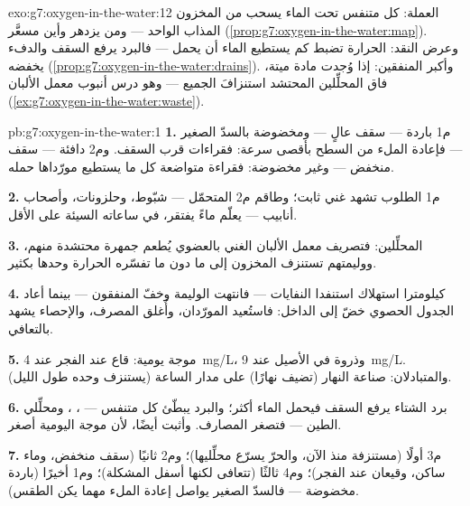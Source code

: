 \begin{solution}{exo:g7:oxygen-in-the-water:12}
العملة: كل متنفس تحت الماء يسحب من المخزون المذاب الواحد --- ومن
يزدهر وأين مسعَّر 
(\cref{prop:g7:oxygen-in-the-water:map}). وعرض النقد: الحرارة تضبط
كم يستطيع الماء أن يحمل --- فالبرد يرفع السقف والدفء يخفضه
(\cref{prop:g7:oxygen-in-the-water:drains}). وأكبر المنفقين: إذا
وُجدت مادة ميتة، فاق  المحلِّلين المحتشد استنزافَ الجميع ---
وهو درس أنبوب معمل الألبان
(\cref{ex:g7:oxygen-in-the-water:waste}).
\end{solution}

\begin{solution}{pb:g7:oxygen-in-the-water:1}
\textbf{1.} م1 باردة --- سقف عالٍ --- ومخضوضة بالسدّ الصغير ---
فإعادة الملء من السطح بأقصى سرعة: فقراءات قرب السقف. وم2 دافئة ---
سقف منخفض --- وغير مخضوضة: فقراءة متواضعة كل ما يستطيع مورّداها
حمله.

\textbf{2.}  م1 الطلوب تشهد  غني ثابت؛ وطاقم م2
المتحمّل --- شبّوط، وحلزونات، وأصحاب أنابيب --- يعلّم ماءً يفتقر،
في ساعاته السيئة على الأقل.

\textbf{3.}  المحلِّلين: فتصريف معمل الألبان الغني بالعضوي
يُطعم جمهرة محتشدة منهم، ووليمتهم تستنزف المخزون إلى ما دون ما
تفسّره الحرارة وحدها بكثير.

\textbf{4.} كيلومترا استهلاك استنفدا النفايات --- فانتهت الوليمة
وخفّ المنفقون --- بينما أعاد الجدول الحصوي خضّ  إلى
الداخل: فاستُعيد المورّدان، وأُغلق المصرف، والإحصاء يشهد بالتعافي.

\textbf{5.} موجة يومية: قاع عند الفجر عند \qty{4}{mg/L}، وذروة في
الأصيل عند \qty{9}{mg/L}. والمتبادلان: صناعة النهار (تضيف نهارًا)
 على مدار الساعة (يستنزف وحده طول الليل).

\textbf{6.} برد الشتاء يرفع السقف فيحمل الماء أكثر؛ والبرد يبطّئ
كل متنفس --- ، ، ومحلِّلي الطين --- فتصغر المصارف.
وأثبت أيضًا، لأن موجة  اليومية أصغر.

\textbf{7.} م3 أولًا (مستنزفة منذ الآن، والحرّ يسرّع محلِّليها)؛
وم2 ثانيًا (سقف منخفض، وماء ساكن، وقيعان عند الفجر)؛ وم4 ثالثًا
(تتعافى لكنها أسفل المشكلة)؛ وم1 أخيرًا (باردة مخضوضة --- فالسدّ
الصغير يواصل إعادة الملء مهما يكن الطقس).


\end{solution}

